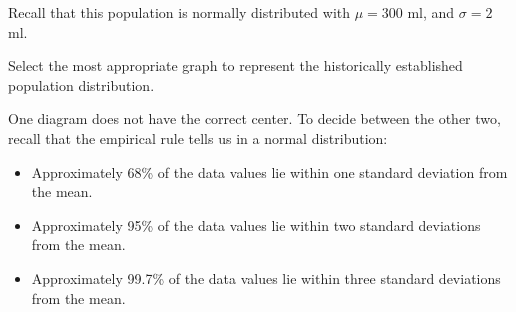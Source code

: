 \documentclass{ximera}
\begin{document}
\begin{question}\label{quest:popBellCurve}
Recall that this population is normally distributed with $\mu=300$ ml, and $\sigma=2$ ml.  

Select the most appropriate graph to represent the historically established population distribution.

\begin{hint}
    One diagram does not have the correct center.  To decide between the other two, recall that the empirical rule tells us in a normal distribution:
    \begin{itemize}
        \item Approximately 68\% of the data values lie within one standard deviation from the mean.
        \item Approximately 95\% of the data values lie within two standard deviations from the mean.
        \item Approximately 99.7\% of the data values lie within three standard deviations from the mean.
    \end{itemize}
\end{hint}


\end{question}
\end{document}
